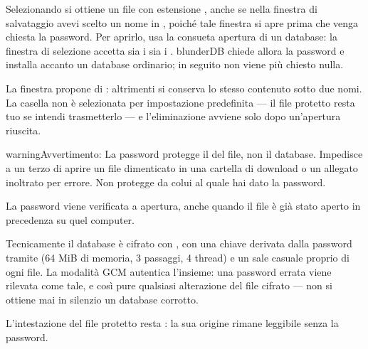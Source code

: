 \documentclass[letterpaper,10pt,italian]{sphinxmanual}
\begin{document}
\sphinxAtStartPar
Selezionando  si ottiene un file con estensione , anche se nella finestra di salvataggio avevi scelto un nome in , poiché tale finestra si apre prima che venga chiesta la password. Per aprirlo, usa la consueta apertura di un database: la finestra di selezione accetta sia i  sia i . blunderDB chiede allora la password e installa accanto un database ordinario; in seguito non viene più chiesto nulla.

\sphinxAtStartPar
La finestra propone di : altrimenti si conserva lo stesso contenuto sotto due nomi. La casella non è selezionata per impostazione predefinita — il file protetto resta tuo se intendi trasmetterlo — e l’eliminazione avviene solo dopo un’apertura riuscita.

\begin{sphinxadmonition}{warning}{Avvertimento:}
\sphinxAtStartPar
La password protegge il  del file, non il database. Impedisce a un terzo di aprire un file dimenticato in una cartella di download o un allegato inoltrato per errore. Non protegge da colui al quale hai dato la password.
\end{sphinxadmonition}

\sphinxAtStartPar
La password viene verificata a  apertura, anche quando il file è già stato aperto in precedenza su quel computer.

\sphinxAtStartPar
Tecnicamente il database è cifrato con , con una chiave derivata dalla password tramite  (64 MiB di memoria, 3 passaggi, 4 thread) e un sale casuale proprio di ogni file. La modalità GCM autentica l’insieme: una password errata viene rilevata come tale, e così pure qualsiasi alterazione del file cifrato — non si ottiene mai in silenzio un database corrotto.

\sphinxAtStartPar
L’intestazione del file protetto resta : la sua origine rimane leggibile senza la password.
\end{document}
